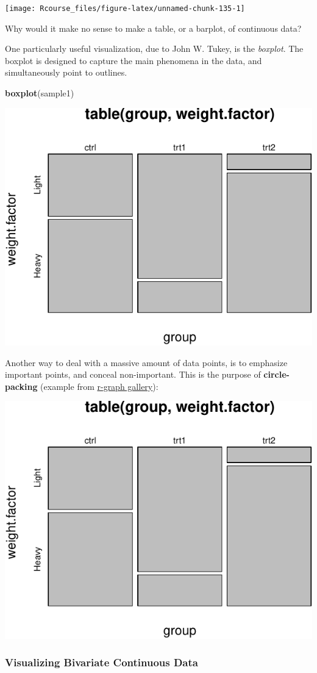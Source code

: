 \documentclass[]{book}
\newenvironment{Shaded}{\begin{snugshade}}{\end{snugshade}}
\newcommand{\KeywordTok}[1]{\textcolor[rgb]{0.13,0.29,0.53}{\textbf{#1}}}
\newcommand{\NormalTok}[1]{#1}
\theoremstyle{definition}
\theoremstyle{definition}
\theoremstyle{definition}
\theoremstyle{remark}
\let\BeginKnitrBlock\begin \let\EndKnitrBlock\end
\begin{document}
\texttt{[image: Rcourse\_files/figure-latex/unnamed-chunk-135-1]}

\BeginKnitrBlock{remark}
{}Why would it make no sense to make a table,
or a barplot, of continuous data?
\EndKnitrBlock{remark}

One particularly useful visualization, due to John W. Tukey, is the
\emph{boxplot}. The boxplot is designed to capture the main phenomena in
the data, and simultaneously point to outlines.

\begin{Shaded}
\begin{Highlighting}[]
\KeywordTok{boxplot}\NormalTok{(sample1)    }
\end{Highlighting}
\end{Shaded}

\includegraphics[width=0.5\linewidth]{Rcourse_files/figure-latex/unnamed-chunk-137-1}

Another way to deal with a massive amount of data points, is to
emphasize important points, and conceal non-important. This is the
purpose of \textbf{circle-packing} (example from
\href{https://www.r-graph-gallery.com/308-interactive-circle-packing/}{r-graph
gallery}):

\includegraphics[width=0.5\linewidth]{Rcourse_files/figure-latex/unnamed-chunk-138-1}

\subsubsection{Visualizing Bivariate Continuous
Data}\label{visualizing-bivariate-continuous-data}
\end{document}
